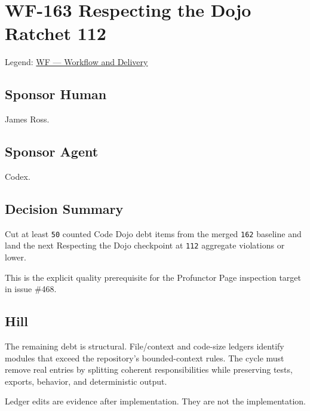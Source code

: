 \chapter{WF-163 Respecting the Dojo Ratchet 112}\label{record-245}

\smallskip

Legend: \href{https://github.com/flyingrobots/bijou/blob/1853ad902f6bf219326409e7f743a5a1d6517dbc/docs/legends/WF-workflow-and-delivery.md}{WF --- Workflow and Delivery}

\section{Sponsor Human}\label{record-245-sponsor-human}

James Ross.

\section{Sponsor Agent}\label{record-245-sponsor-agent}

Codex.

\section{Decision Summary}\label{record-245-decision-summary}

Cut at least \texttt{5\allowbreak{}0} counted Code Dojo debt items from the merged \texttt{1\allowbreak{}6\allowbreak{}2} baseline and land the next Respecting the Dojo checkpoint at \texttt{1\allowbreak{}1\allowbreak{}2} aggregate violations or lower.

This is the explicit quality prerequisite for the Profunctor Page inspection target in issue \#468.

\section{Hill}\label{record-245-hill}

The remaining debt is structural. File/context and code-size ledgers identify modules that exceed the repository's bounded-context rules. The cycle must remove real entries by splitting coherent responsibilities while preserving tests, exports, behavior, and deterministic output.

Ledger edits are evidence after implementation. They are not the implementation.


